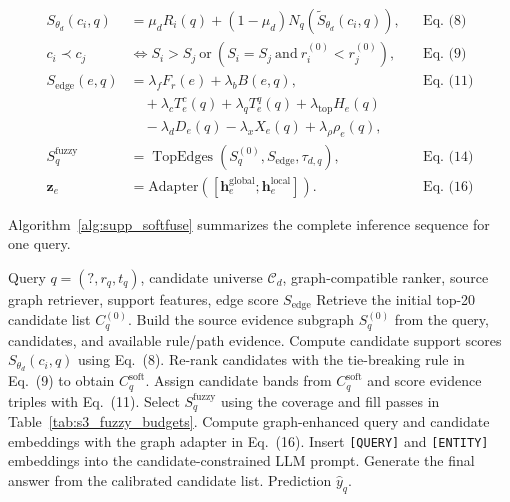 \documentclass[11pt]{article}
\newcommand{\softfuse}{SoftFuse-KGC}
\newcommand{\mainequation}[1]{Eq.~(#1)}
\begin{document}
    \[
    \begin{aligned}
    S_{\theta_d}(c_i,q)&=\mu_dR_i(q)+(1-\mu_d)N_q(\widetilde{S}_{\theta_d}(c_i,q)), &&\text{\mainequation{8}}\\
    c_i\prec c_j&\Longleftrightarrow S_i>S_j\ \mathrm{or}\ (S_i=S_j\ \mathrm{and}\ r_i^{(0)}<r_j^{(0)}), &&\text{\mainequation{9}}\\
    S_{\mathrm{edge}}(e,q)&=
    \lambda_fF_r(e)+\lambda_bB(e,q), &&\text{\mainequation{11}}\\
    &\quad+\lambda_cT^c_e(q)+\lambda_qT^q_e(q)+\lambda_{\mathrm{top}}H_e(q)\\
    &\quad-\lambda_dD_e(q)-\lambda_xX_e(q)+\lambda_\rho\rho_e(q),\\
    S^{\mathrm{fuzzy}}_q&=
    \operatorname{TopEdges}\!\left(S^{(0)}_q,S_{\mathrm{edge}},\tau_{d,q}\right), &&\text{\mainequation{14}}\\
    \mathbf{z}_e&=
    \mathrm{Adapter}\left([\mathbf{h}^{\mathrm{global}}_e;\mathbf{h}^{\mathrm{local}}_e]\right). &&\text{\mainequation{16}}
    \end{aligned}
    \]

    Algorithm~\ref{alg:supp_softfuse} summarizes the complete inference sequence for one query.

    \begin{algorithm}[H]
    \footnotesize
    \caption{\softfuse{} inference for one query}
    \label{alg:supp_softfuse}
    \begin{algorithmic}[1]
    \REQUIRE Query \(q=(?,r_q,t_q)\), candidate universe \(\mathcal{C}_d\), graph-compatible ranker, source graph retriever, support features, edge score \(S_{\mathrm{edge}}\)
    \STATE Retrieve the initial top-20 candidate list \(C_q^{(0)}\).
    \STATE Build the source evidence subgraph \(S_q^{(0)}\) from the query, candidates, and available rule/path evidence.
    \STATE Compute candidate support scores \(S_{\theta_d}(c_i,q)\) using \mainequation{8}.
    \STATE Re-rank candidates with the tie-breaking rule in \mainequation{9} to obtain \(C_q^{\mathrm{soft}}\).
    \STATE Assign candidate bands from \(C_q^{\mathrm{soft}}\) and score evidence triples with \mainequation{11}.
    \STATE Select \(S_q^{\mathrm{fuzzy}}\) using the coverage and fill passes in Table~\ref{tab:s3_fuzzy_budgets}.
    \STATE Compute graph-enhanced query and candidate embeddings with the graph adapter in \mainequation{16}.
    \STATE Insert \texttt{[QUERY]} and \texttt{[ENTITY]} embeddings into the candidate-constrained LLM prompt.
    \STATE Generate the final answer from the calibrated candidate list.
    \RETURN Prediction \(\hat{y}_q\).
    \end{algorithmic}
    \end{algorithm}
    \FloatBarrier
\end{document}
